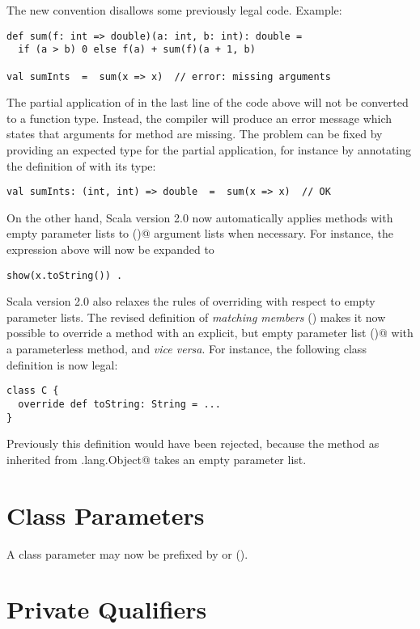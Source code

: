 The new convention disallows some previously legal code. Example:
\begin{lstlisting}
def sum(f: int => double)(a: int, b: int): double =
  if (a > b) 0 else f(a) + sum(f)(a + 1, b)

val sumInts  =  sum(x => x)  // error: missing arguments
\end{lstlisting}
The partial application of \lstinline@sum@ in the last line of
the code above will not be converted to a function type. Instead, the
compiler will produce an error message which states that arguments for method
\lstinline@sum@ are missing. The problem can be fixed by providing an
expected type for the partial application, for instance by annotating
the definition of \lstinline@sumInts@ with its type:
\begin{lstlisting}
val sumInts: (int, int) => double  =  sum(x => x)  // OK
\end{lstlisting}

On the other hand, Scala version 2.0 now automatically applies methods
with empty parameter lists to \lstinline@()@ argument lists when
necessary. For instance, the \lstinline@show@ expression above will
now be expanded to
\begin{lstlisting}
show(x.toString()) .
\end{lstlisting}

Scala version 2.0 also relaxes the rules of overriding with respect to
empty parameter lists. The revised definition of {\em matching
members} () makes it now possible to override a
method with an explicit, but empty parameter list \lstinline@()@ with
a parameterless method, and {\em vice versa}. For instance, 
the following class definition is now legal:
\begin{lstlisting}
class C {
  override def toString: String = ...
}
\end{lstlisting}
Previously this definition would have been rejected, because the
\lstinline@toString@ method as inherited from
\lstinline@java.lang.Object@ takes an empty parameter list.  

\section{Class Parameters}

A class parameter may now be prefixed by \lstinline@val@ or
\lstinline@var@ (). 

\section{Private Qualifiers}

